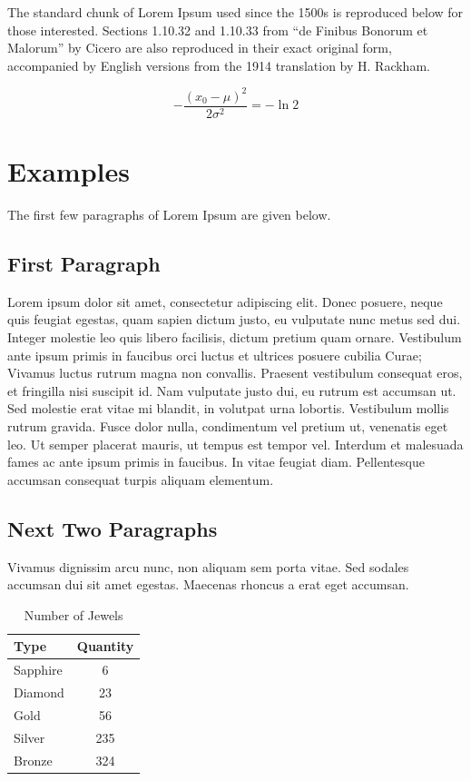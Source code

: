 The standard chunk of Lorem Ipsum used since the 1500s is reproduced below for those interested. Sections 1.10.32 and 1.10.33 from ``de Finibus Bonorum et Malorum'' by Cicero are also reproduced in their exact original form, accompanied by English versions from the 1914 translation by H. Rackham. 

\begin{equation}
-\frac{(x_0 - \mu)^2}{2 \sigma^2} = -\ln 2
\end{equation}


\section{Examples}
\label{sec:examples}

The first few paragraphs of Lorem Ipsum are given below.

\subsection{First Paragraph}

Lorem ipsum dolor sit amet, consectetur adipiscing elit. Donec posuere, neque quis feugiat egestas, quam sapien dictum justo, eu vulputate nunc metus sed dui. Integer molestie leo quis libero facilisis, dictum pretium quam ornare. Vestibulum ante ipsum primis in faucibus orci luctus et ultrices posuere cubilia Curae; Vivamus luctus rutrum magna non convallis. Praesent vestibulum consequat eros, et fringilla nisi suscipit id. Nam vulputate justo dui, eu rutrum est accumsan ut. Sed molestie erat vitae mi blandit, in volutpat urna lobortis. Vestibulum mollis rutrum gravida. Fusce dolor nulla, condimentum vel pretium ut, venenatis eget leo. Ut semper placerat mauris, ut tempus est tempor vel. Interdum et malesuada fames ac ante ipsum primis in faucibus. In vitae feugiat diam. Pellentesque accumsan consequat turpis aliquam elementum.


\subsection{Next Two Paragraphs}

Vivamus dignissim arcu nunc, non aliquam sem porta vitae. Sed sodales accumsan dui sit amet egestas. Maecenas rhoncus a erat eget accumsan. 

\begin{table}[p!]\centering
\caption{Number of Jewels}

\begin{tabular}{l c}
\hline
Type & Quantity \\\hline
Sapphire & 6\\
Diamond & 23\\
Gold & 56\\
Silver & 235\\
Bronze & 324\\\hline
\end{tabular}
\end{table}

